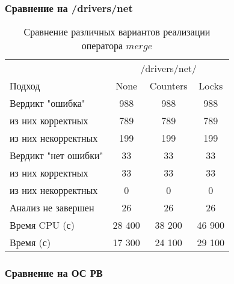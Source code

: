 \subsubsection{Сравнение на /drivers/net}
\begin{center}
  \begin{table}[h]\footnotesize
  	\label{table-drivers-lock-merge}
    \caption{Сравнение различных вариантов реализации оператора $merge$}
    \begin{tabular}{ | l | c | c | c | }
      \hline
      		& 		 \multicolumn{3}{|c|}{/drivers/net/} \\
      Подход         				& None 	& Counters 	& Locks  \\ \hline
      Вердикт "ошибка" 				& 988   & 988       & 988       \\ 
  \hspace{0.5cm} из них корректных 	& 789 	& 789 		& 789     \\ 
  \hspace{0.5cm} из них некорректных & 199 	& 199 		& 199       \\ \hline
      Вердикт "нет ошибки"  		& 33    & 33        & 33      \\ 
  \hspace{0.5cm} из них корректных 	& 33 	& 33    	& 33      \\
  \hspace{0.5cm} из них некорректных & 0 	& 0    		& 0     \\ \hline
      Анализ не завершен       		& 26    & 26        & 26    \\ \hline
      Время CPU (с)   				& 28 400 & 38 200   & 46 900    \\ 
      Время (с)  					& 17 300 & 24 100   & 29 100      \\
      \hline
    \end{tabular}
  \end{table}
\end{center}

\subsubsection{Сравнение на ОС РВ}

